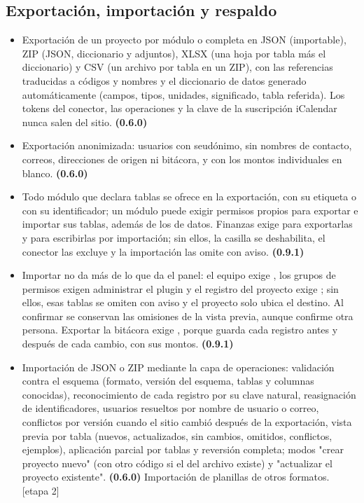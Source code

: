 \documentclass[11pt,a4paper]{article}
\newcommand{\etapa}[1]{\textcolor{grismedio}{[etapa #1]}}
\begin{document}
\subsection{Exportación, importación y respaldo}
\label{sec:datos}
\begin{itemize}
\item Exportación de un proyecto por módulo o completa en JSON (importable), ZIP (JSON, diccionario y adjuntos), XLSX (una hoja por tabla más el diccionario) y CSV (un archivo por tabla en un ZIP), con las referencias traducidas a códigos y nombres y el diccionario de datos generado automáticamente (campos, tipos, unidades, significado, tabla referida). Los tokens del conector, las operaciones y la clave de la suscripción iCalendar nunca salen del sitio. \textbf{(0.6.0)}
\item Exportación anonimizada: usuarios con seudónimo, sin nombres de contacto, correos, direcciones de origen ni bitácora, y con los montos individuales en blanco. \textbf{(0.6.0)}
\item Todo módulo que declara tablas se ofrece en la exportación, con su etiqueta o con su identificador; un módulo puede exigir permisos propios para exportar e importar sus tablas, además de los de datos. Finanzas exige  para exportarlas y  para escribirlas por importación; sin ellos, la casilla se deshabilita, el conector las excluye y la importación las omite con aviso. \textbf{(0.9.1)}
\item Importar no da más de lo que da el panel: el equipo exige , los grupos de permisos exigen administrar el plugin y el registro del proyecto exige ; sin ellos, esas tablas se omiten con aviso y el proyecto solo ubica el destino. Al confirmar se conservan las omisiones de la vista previa, aunque confirme otra persona. Exportar la bitácora exige , porque guarda cada registro antes y después de cada cambio, con sus montos. \textbf{(0.9.1)}
\item Importación de JSON o ZIP mediante la capa de operaciones: validación contra el esquema (formato, versión del esquema, tablas y columnas conocidas), reconocimiento de cada registro por su clave natural, reasignación de identificadores, usuarios resueltos por nombre de usuario o correo, conflictos por versión cuando el sitio cambió después de la exportación, vista previa por tabla (nuevos, actualizados, sin cambios, omitidos, conflictos, ejemplos), aplicación parcial por tablas y reversión completa; modos "crear proyecto nuevo" (con otro código si el del archivo existe) y "actualizar el proyecto existente". \textbf{(0.6.0)} Importación de planillas de otros formatos. \etapa{2}

\end{itemize}
\end{document}
